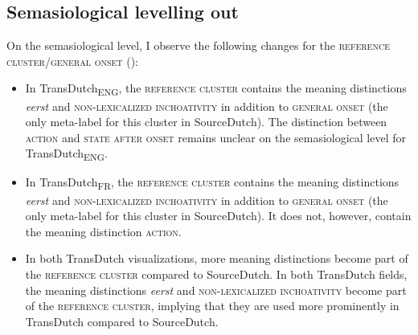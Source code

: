 \clearpage

\subsection{\label{sec:4.5.1}Semasiological levelling out}

On the semasiological level, I observe the following changes for the \textsc{reference cluster}\slash\textsc{general onset} ():


\begin{itemize}
\item  In TransDutch\textsubscript{ENG}, the \textsc{reference cluster} contains the meaning distinctions \textit{eerst} and {\textsc{non-lexicalized inchoativity}} in addition to \textsc{general onset} (the only meta-label for this cluster in SourceDutch). The distinction between \textsc{action} and \textsc{state after onset} remains unclear on the semasiological level for TransDutch\textsubscript{ENG}.
\item  In TransDutch\textsubscript{FR}, the \textsc{reference cluster} contains the meaning distinctions \textit{eerst} and {\textsc{non-lexicalized inchoativity}} in addition to \textsc{general onset} (the only meta-label for this cluster in SourceDutch). It does not, however, contain the meaning distinction \textsc{action}.
\item  In both TransDutch visualizations, more meaning distinctions become part of the \textsc{reference cluster} compared to SourceDutch. In both TransDutch fields, the meaning distinctions \textit{eerst} and {\textsc{non-lexicalized inchoativity}} become part of the \textsc{reference cluster}, implying that they are used more prominently in TransDutch compared to SourceDutch.
\end{itemize}

